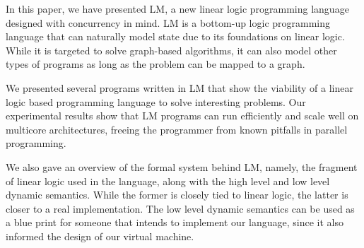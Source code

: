 In this paper, we have presented LM, a new linear logic programming language designed with concurrency in mind. LM is a bottom-up logic programming language
that can naturally model state due to its foundations on linear logic. While it is targeted to solve graph-based algorithms, it can also model other
types of programs as long as the problem can be mapped to a graph.

We presented several programs written in LM that show the viability of a linear logic based programming language to solve interesting problems. Our experimental
results show that LM programs can run efficiently and scale well on multicore architectures, freeing the programmer from known pitfalls in parallel programming.

We also gave an overview of the formal system behind LM, namely, the fragment of linear logic used in the language, along with the high level and low level dynamic semantics.
While the former is closely tied to linear logic, the latter is closer to a real implementation. The low level dynamic semantics can be used as a blue print for someone that
intends to implement our language, since it also informed the design of our virtual machine.